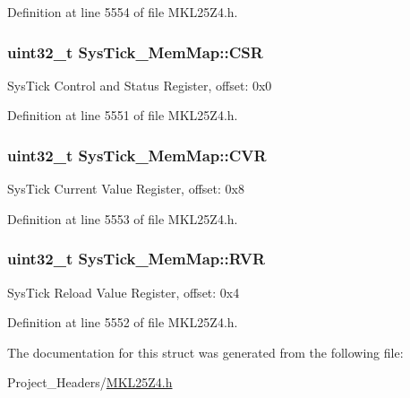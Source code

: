 Definition at line 5554 of file M\+K\+L25\+Z4.\+h.

\subsubsection[{\texorpdfstring{C\+SR}{CSR}}]{\setlength{\rightskip}{0pt plus 5cm}uint32\+\_\+t Sys\+Tick\+\_\+\+Mem\+Map\+::\+C\+SR}\hypertarget{struct_sys_tick___mem_map_aec23689880afd46876916055403e867a}{}\label{struct_sys_tick___mem_map_aec23689880afd46876916055403e867a}
Sys\+Tick Control and Status Register, offset\+: 0x0 

Definition at line 5551 of file M\+K\+L25\+Z4.\+h.

\subsubsection[{\texorpdfstring{C\+VR}{CVR}}]{\setlength{\rightskip}{0pt plus 5cm}uint32\+\_\+t Sys\+Tick\+\_\+\+Mem\+Map\+::\+C\+VR}\hypertarget{struct_sys_tick___mem_map_a508dd628bc347f199e7baf4b1bfbfa0d}{}\label{struct_sys_tick___mem_map_a508dd628bc347f199e7baf4b1bfbfa0d}
Sys\+Tick Current Value Register, offset\+: 0x8 

Definition at line 5553 of file M\+K\+L25\+Z4.\+h.

\subsubsection[{\texorpdfstring{R\+VR}{RVR}}]{\setlength{\rightskip}{0pt plus 5cm}uint32\+\_\+t Sys\+Tick\+\_\+\+Mem\+Map\+::\+R\+VR}\hypertarget{struct_sys_tick___mem_map_a3f2018b492fd4bc1d141a718d499e50f}{}\label{struct_sys_tick___mem_map_a3f2018b492fd4bc1d141a718d499e50f}
Sys\+Tick Reload Value Register, offset\+: 0x4 

Definition at line 5552 of file M\+K\+L25\+Z4.\+h.



The documentation for this struct was generated from the following file\+:\begin{DoxyCompactItemize}
\item 
Project\+\_\+\+Headers/\hyperlink{_m_k_l25_z4_8h}{M\+K\+L25\+Z4.\+h}\end{DoxyCompactItemize}
